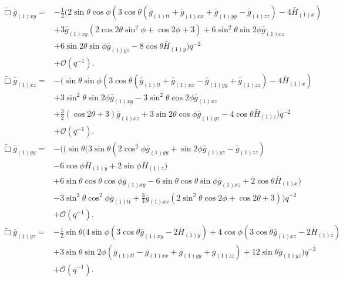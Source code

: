 \documentclass[12pt]{iopart}
\begin{document}
\begin{eqnarray}\label{eqn:efexy}
\tilde{\Box}\bar{g}_{(1)xy}=&-\frac{1}{2} (2 \sin \theta  \cos \phi  (3 \cos \theta (\bar{g}_{(1)tt}+\bar{g}_{(1)xx}+\bar{g}_{(1)yy}-\bar{g}_{(1)zz})-4 \bar{H}_{(1) x}) \nonumber \\
&+3 \bar{g}_{(1)xy} (2 \cos 2\theta  \sin ^2\phi +\cos 2 \phi +3)+6 \sin ^2\theta  \sin 2 \phi 
   \bar{g}_{(1)xz} \nonumber \\
   &+6 \sin 2 \theta  \sin \phi  \bar{g}_{(1)yz}-8 \cos
   \theta  \bar{H}_{(1) y})    q^{-2} \nonumber \\
&+\mathcal{O}(q^{-1}).
\end{eqnarray}
\begin{eqnarray}\label{eqn:efexz}
\tilde{\Box}\bar{g}_{(1)xz}=&- (\sin \theta  \sin \phi  (3 \cos \theta  (\bar{g}_{(1)tt}+\bar{g}_{(1)xx}-\bar{g}_{(1)yy}+\bar{g}_{(1)zz})-4
   \bar{H}_{(1) x}) \nonumber \\
   &+3 \sin ^2\theta \sin 2 \phi  \bar{g}_{(1)xy}-3 \sin
   ^2\theta  \cos 2 \phi  \bar{g}_{(1)xz} \nonumber \\
   &+\frac{3}{2} (\cos 2 \theta +3)
   \bar{g}_{(1)xz}+3 \sin 2 \theta  \cos \phi  \bar{g}_{(1)yz}-4 \cos
   \theta  \bar{H}_{(1)z})    q^{-2} \nonumber \\
&+\mathcal{O}(q^{-1}).
\end{eqnarray}
\begin{eqnarray}\label{eqn:efeyy}
\tilde{\Box}\bar{g}_{(1)yy}=&-( (\sin \theta (3 \sin \theta  (2 \cos ^2\phi  \bar{g}_{(1)yy}+\sin 2 \phi  \bar{g}_{(1)yz}-\bar{g}_{(1)zz}) \nonumber \\
&-6 \cos\phi \bar{H}_{(1) y}+2 \sin \phi  \bar{H}_{(1) z}) \nonumber \\
&+6 \sin \theta \cos
   \theta \cos \phi  \bar{g}_{(1)xy}-6 \sin \theta  \cos \theta  \sin   \phi  \bar{g}_{(1)xz}+2 \cos \theta  \bar{H}_{(1) x}) \nonumber \\
   &-3 \sin ^2\theta \cos ^2\phi  \bar{g}_{(1)tt}+\frac{3}{4} \bar{g}_{(1)xx} (2 \sin ^2\theta  \cos 2 \phi +\cos 2 \theta +3)  )  q^{-2} \nonumber \\
&+\mathcal{O}(q^{-1}).
\end{eqnarray}
\begin{eqnarray}\label{eqn:efeyz}
\tilde{\Box}\bar{g}_{(1)yz}=&-\frac{1}{2} \sin \theta (4 \sin \phi  (3 \cos \theta  \bar{g}_{(1)xy}-2 \bar{H}_{(1) y})+4 \cos \phi  (3 \cos \theta  \bar{g}_{(1)xz}-2 \bar{H}_{(1) z}) \nonumber \\
&+3 \sin \theta  \sin 2 \phi  (\bar{g}_{(1)tt}-\bar{g}_{(1)xx}+\bar{g}_{(1)yy}+\bar{g}_{(1)zz})+12 \sin \theta  \bar{g}_{(1)yz})  q^{-2} \nonumber \\
&+\mathcal{O}(q^{-1}).
\end{eqnarray}
\end{document}

